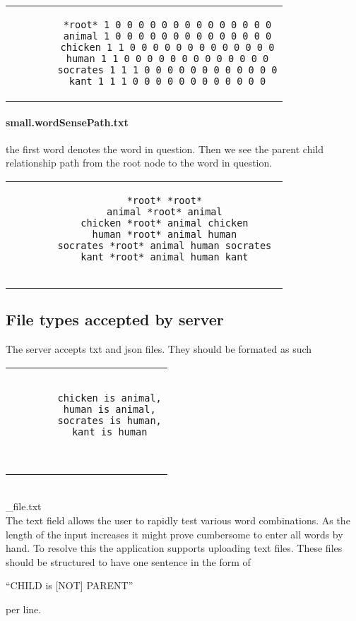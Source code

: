 \begin{center}
	\begin{tabular}{c}
		\begin{lstlisting}
		*root* 1 0 0 0 0 0 0 0 0 0 0 0 0 0 0
		animal 1 0 0 0 0 0 0 0 0 0 0 0 0 0 0
		chicken 1 1 0 0 0 0 0 0 0 0 0 0 0 0 0
		human 1 1 0 0 0 0 0 0 0 0 0 0 0 0 0
		socrates 1 1 1 0 0 0 0 0 0 0 0 0 0 0 0
		kant 1 1 1 0 0 0 0 0 0 0 0 0 0 0 0
		\end{lstlisting}
	\end{tabular}
\end{center}

\paragraph{small.wordSensePath.txt} the first word denotes the word in question. Then we see the parent child relationship path from the root node to the word in question.

\begin{center}
	\begin{tabular}{c}
		\begin{lstlisting}
		*root* *root* 
		animal *root* animal 
		chicken *root* animal chicken 
		human *root* animal human 
		socrates *root* animal human socrates 
		kant *root* animal human kant 
		
		\end{lstlisting}
	\end{tabular}
\end{center}



\subsection{File types accepted by server}
The server accepts txt and json files. They should be formated as such

\begin{center}
	\begin{tabular}{c}
		\begin{lstlisting}
		
		chicken is animal,
		human is animal,
		socrates is human,
		kant is human
		
		
		\end{lstlisting}
	\end{tabular}
	\\_file.txt
	\\The text field allows the user to rapidly test various word combinations. As the length of the input increases it might prove cumbersome to enter all words by hand. To resolve this the application supports uploading text files. These files should be structured to have one sentence in the form of
	\begin{center}
		“CHILD is [NOT] PARENT”
	\end{center}
	per line.
\end{center}

